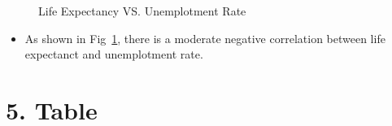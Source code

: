 \documentclass[
  letterpaper,
  DIV=11,
  numbers=noendperiod]{scrartcl}
\providecommand{\tightlist}{%
  \setlength{\itemsep}{0pt}\setlength{\parskip}{0pt}}\usepackage{longtable,booktabs,array}
\begin{document}
\begin{figure}


\caption{\label{fig-compare}Life Expectancy VS. Unemplotment Rate}

\end{figure}%

\begin{itemize}
\tightlist
\item
  As shown in Fig~\ref{fig-compare}, there is a moderate negative
  correlation between life expectanct and unemplotment rate.
\end{itemize}

\section{5. Table}\label{table}
\end{document}
